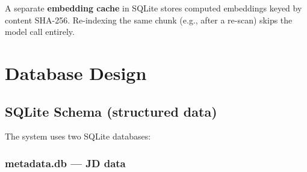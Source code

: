 \documentclass[12pt, a4paper]{article}
\begin{document}
A separate \textbf{embedding cache} in SQLite stores computed embeddings keyed by content SHA-256. Re-indexing the same chunk (e.g., after a re-scan) skips the model call entirely.

\section{Database Design}

\subsection{SQLite Schema (structured data)}

The system uses two SQLite databases:

\subsubsection{metadata.db --- JD data}
\end{document}
